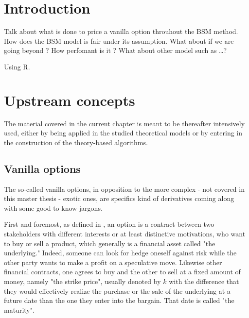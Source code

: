 \documentclass[12pt]{report}
\begin{document}

\tableofcontents{}



%
%
\chapter*{Introduction}
\label{cha:Introduction}

Talk about what is done to price a vanilla option throuhout the BSM method.
How does the BSM model is fair under its assumption. What about if we are going beyond ?
How perfomant is it ? 
What about other model such as \ldots ?

Using R. \cite{R}
%
%
\chapter{Upstream concepts}
\label{cha:upstream}



The material covered in the current chapter is meant to be thereafter intensively used, either by being applied in the studied theoretical models or by entering in the construction of the theory-based algorithms.

\section{Vanilla options}
\label{sec:upstream:vanilla}

The so-called vanilla options, in opposition to the more complex - not covered in this master thesis - exotic ones, are specifics kind of derivatives coming along with some good-to-know jargons. 

First and foremost,  as defined in \citet{hull}, an option is a contract between two stakeholders with different interests or at least distinctive motivations, who want to buy or sell a product, which generally is a financial asset called "the underlying." 
Indeed, someone can look for hedge oneself against risk while the other party wants to make a profit on a speculative move.
Likewise other financial contracts, one agrees to buy and the other to sell at a fixed amount of money, namely "the strike price", usually denoted by $k$ with the difference that they would effectively realize the purchase or the sale of the underlying at a future date than the one they enter into the bargain. That date is called "the maturity".
\end{document}
